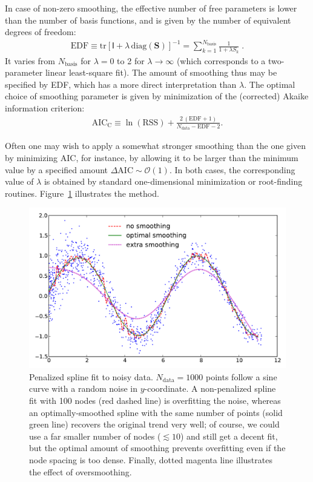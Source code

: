 \documentclass[12pt]{article}
\begin{document}
In case of non-zero smoothing, the effective number of free parameters is lower than the number of basis functions, and is given by the number of equivalent degrees of freedom:
\begin{align}
\mathrm{EDF} \equiv \mathrm{tr}[\mathsf{I} + \lambda\,\mathrm{diag}(\boldsymbol{S})]^{-1} =
\sum_{k=1}^{N_\mathrm{basis}} \frac{1}{1+\lambda S_k} \;.
\end{align}
It varies from $N_\mathrm{basis}$ for $\lambda=0$ to 2 for $\lambda\to\infty$ (which corresponds to a two-parameter linear least-square fit). The amount of smoothing thus may be specified by EDF, which has a more direct interpretation than $\lambda$. The optimal choice of smoothing parameter is given by minimization of the (corrected) Akaike information criterion:
\begin{align}
\mathrm{AIC_C} \equiv \ln(\mathrm{RSS}) + \frac{2\,(\mathrm{EDF}+1)}{N_\mathrm{data}-\mathrm{EDF}-2}.
\end{align}

Often one may wish to apply a somewhat stronger smoothing than the one given by minimizing AIC, for instance, by allowing it to be larger than the minimum value by a specified amount $\Delta\mathrm{AIC}\sim \mathcal{O}(1)$. In both cases, the corresponding value of $\lambda$ is  obtained by standard one-dimensional minimization or root-finding routines. Figure~\ref{fig:SplineFit} illustrates the method.

\begin{figure}[t]
\begin{center}
\includegraphics[width=12cm]{SplineFit.pdf}
\end{center}
\caption{Penalized spline fit to noisy data. $N_\mathrm{data}=1000$ points follow a sine curve with a random noise in $y$-coordinate. A non-penalized spline fit with 100 nodes (red dashed line) is overfitting the noise, whereas an optimally-smoothed spline with the same number of points (solid green line) recovers the original trend very well; of course, we could use a far smaller number of nodes ($\lesssim 10$) and still get a decent fit, but the optimal amount of smoothing prevents overfitting even if the node spacing is too dense. Finally, dotted magenta line illustrates the effect of oversmoothing.
} \label{fig:SplineFit}
\end{figure}
\end{document}
